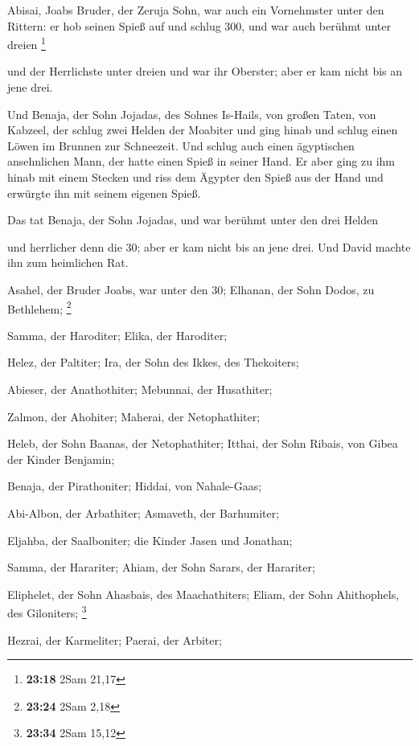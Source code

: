  Abisai, Joabs Bruder, der Zeruja Sohn, war auch ein
Vornehmster unter den Rittern: er hob seinen Spieß auf und schlug 300,
und war auch berühmt unter dreien \footnote{\textbf{23:18} 2Sam 21,17}

 und der Herrlichste unter dreien und war ihr Oberster;
aber er kam nicht bis an jene drei.

 Und Benaja, der Sohn Jojadas, des Sohnes Is-Hails, von
großen Taten, von Kabzeel, der schlug zwei Helden der Moabiter und ging
hinab und schlug einen Löwen im Brunnen zur Schneezeit. 
Und schlug auch einen ägyptischen ansehnlichen Mann, der hatte einen
Spieß in seiner Hand. Er aber ging zu ihm hinab mit einem Stecken und
riss dem Ägypter den Spieß aus der Hand und erwürgte ihn mit seinem
eigenen Spieß.

 Das tat Benaja, der Sohn Jojadas, und war berühmt unter
den drei Helden

 und herrlicher denn die 30; aber er kam nicht bis an
jene drei. Und David machte ihn zum heimlichen Rat.

 Asahel, der Bruder Joabs, war unter den 30; Elhanan, der
Sohn Dodos, zu Bethlehem; \footnote{\textbf{23:24} 2Sam 2,18}

 Samma, der Haroditer; Elika, der Haroditer;

 Helez, der Paltiter; Ira, der Sohn des Ikkes, des
Thekoiters;

 Abieser, der Anathothiter; Mebunnai, der Husathiter;

 Zalmon, der Ahohiter; Maherai, der Netophathiter;

 Heleb, der Sohn Baanas, der Netophathiter; Itthai, der
Sohn Ribais, von Gibea der Kinder Benjamin;

 Benaja, der Pirathoniter; Hiddai, von Nahale-Gaas;

 Abi-Albon, der Arbathiter; Asmaveth, der Barhumiter;

 Eljahba, der Saalboniter; die Kinder Jasen und Jonathan;

 Samma, der Harariter; Ahiam, der Sohn Sarars, der
Harariter;

 Eliphelet, der Sohn Ahasbais, des Maachathiters; Eliam,
der Sohn Ahithophels, des Giloniters; \footnote{\textbf{23:34} 2Sam
  15,12}

 Hezrai, der Karmeliter; Paerai, der Arbiter;

